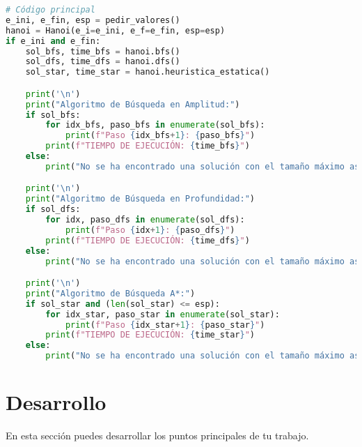 \documentclass{article}
\begin{document}
\begin{lstlisting}[language=Python]
# Código principal
e_ini, e_fin, esp = pedir_valores()
hanoi = Hanoi(e_i=e_ini, e_f=e_fin, esp=esp)
if e_ini and e_fin:
    sol_bfs, time_bfs = hanoi.bfs()
    sol_dfs, time_dfs = hanoi.dfs()
    sol_star, time_star = hanoi.heuristica_estatica()

    print('\n')
    print("Algoritmo de Búsqueda en Amplitud:")
    if sol_bfs:
        for idx_bfs, paso_bfs in enumerate(sol_bfs):
            print(f"Paso {idx_bfs+1}: {paso_bfs}")
        print(f"TIEMPO DE EJECUCIÓN: {time_bfs}")
    else:
        print("No se ha encontrado una solución con el tamaño máximo asignado al conjunto de estados")

    print('\n')
    print("Algoritmo de Búsqueda en Profundidad:")
    if sol_dfs:
        for idx, paso_dfs in enumerate(sol_dfs):
            print(f"Paso {idx+1}: {paso_dfs}")
        print(f"TIEMPO DE EJECUCIÓN: {time_dfs}")
    else:
        print("No se ha encontrado una solución con el tamaño máximo asignado al conjunto de estados")

    print('\n')
    print("Algoritmo de Búsqueda A*:")
    if sol_star and (len(sol_star) <= esp):
        for idx_star, paso_star in enumerate(sol_star):
            print(f"Paso {idx_star+1}: {paso_star}")
        print(f"TIEMPO DE EJECUCIÓN: {time_star}")
    else:
        print("No se ha encontrado una solución con el tamaño máximo asignado al conjunto de estados")
\end{lstlisting}



\section{Desarrollo}
En esta sección puedes desarrollar los puntos principales de tu trabajo.
\end{document}
